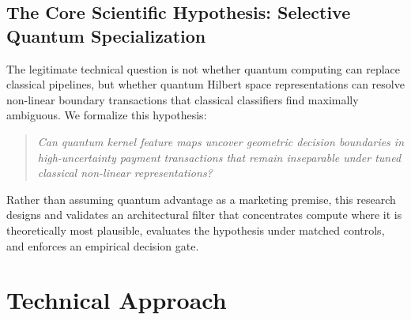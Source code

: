 \documentclass[10pt,a4paper]{article}
\begin{document}
\subsection{The Core Scientific Hypothesis: Selective Quantum Specialization}
The legitimate technical question is not whether quantum computing can replace classical pipelines, but whether quantum Hilbert space representations can resolve non-linear boundary transactions that classical classifiers find maximally ambiguous. We formalize this hypothesis:
\begin{quote}
\textit{Can quantum kernel feature maps uncover geometric decision boundaries in high-uncertainty payment transactions that remain inseparable under tuned classical non-linear representations?}
\end{quote}
Rather than assuming quantum advantage as a marketing premise, this research designs and validates an architectural filter that concentrates compute where it is theoretically most plausible, evaluates the hypothesis under matched controls, and enforces an empirical decision gate.

\clearpage


\section{Technical Approach}
\end{document}
